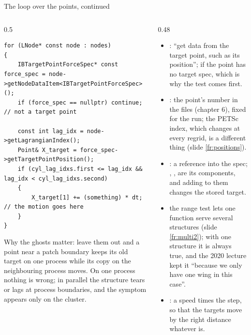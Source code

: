 \documentclass[aspectratio=169,11pt]{beamer}
\begin{document}
\begin{frame}[fragile]{The loop over the points, continued}
\label{fr:loop2}
\begin{columns}[T,onlytextwidth]
\begin{column}{0.5\textwidth}
\begin{lstlisting}[style=cpptiny]
for (LNode* const node : nodes)
{
    IBTargetPointForceSpec* const force_spec = node->getNodeDataItem<IBTargetPointForceSpec>();
    if (force_spec == nullptr) continue;      // not a target point

    const int lag_idx = node->getLagrangianIndex();
    Point& X_target = force_spec->getTargetPointPosition();
    if (cyl_lag_idxs.first <= lag_idx && lag_idx < cyl_lag_idxs.second)
    {
        X_target[1] += (something) * dt;      // the motion goes here
    }
}
\end{lstlisting}
\footnotesize Why the ghosts matter: leave them out and a point near a patch boundary keeps its old target on one process while its copy on the neighbouring process moves. On one process nothing is wrong; in parallel the structure tears or lags at process boundaries, and the symptom appears only on the cluster.
\end{column}
\begin{column}{0.48\textwidth}
\footnotesize
\begin{itemize}
  \item {}: ``get data from the target point, such as its position'';  if the point has no target spec, which is why the test comes first.
  \item {}: the point's number in the files (chapter 6), fixed for the run; the PETSc index, which changes at every regrid, is a different thing (slide \ref{fr:positions}).
  \item {}: a reference into the spec; , \code{[1]}, \code{[2]} are its components, and adding to them changes the stored target.
  \item the range test lets one function serve several structures (slide \ref{fr:multi2}); with one structure it is always true, and the 2020 lecture kept it ``because we only have one wing in this case''.
  \item {}: a speed times the step, so that the targets move by the right distance whatever  is.
\end{itemize}
\end{column}
\end{columns}
\end{frame}
\end{document}
